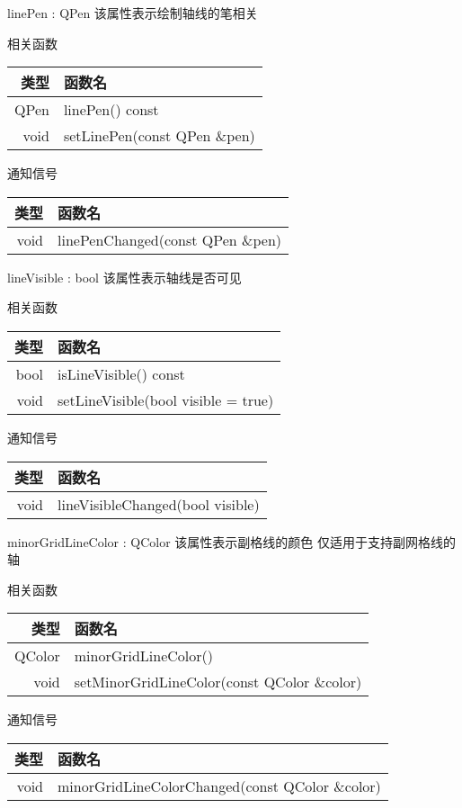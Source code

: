 linePen : QPen 该属性表示绘制轴线的笔相关

相关函数

\begin{tabular}{|r|l|}
\hline
类型&函数名\\ 
\hline
QPen	&linePen() const\\
\hline
void	& setLinePen(const QPen \&pen)\\
\hline
\end{tabular}

通知信号

\begin{tabular}{|r|l|}
\hline
类型&函数名\\ 
\hline
void &	linePenChanged(const QPen \&pen)\\
\hline
\end{tabular}

lineVisible : bool 该属性表示轴线是否可见

相关函数

\begin{tabular}{|r|l|}
\hline
类型&函数名\\ 
\hline
bool&	isLineVisible() const\\
\hline
void &	setLineVisible(bool visible = true)\\
\hline
\end{tabular}

通知信号

\begin{tabular}{|r|l|}
\hline
类型&函数名\\ 
\hline
void &	lineVisibleChanged(bool visible)\\
\hline
\end{tabular}

minorGridLineColor : QColor 该属性表示副格线的颜色 仅适用于支持副网格线的轴

相关函数

\begin{tabular}{|r|l|}
\hline
类型&函数名\\ 
\hline
QColor	&minorGridLineColor()\\
\hline
void &	setMinorGridLineColor(const QColor \&color)\\
\hline
\end{tabular}

通知信号

\begin{tabular}{|r|l|}
\hline
类型&函数名\\ 
\hline
void &	minorGridLineColorChanged(const QColor \&color)\\
\hline
\end{tabular}

